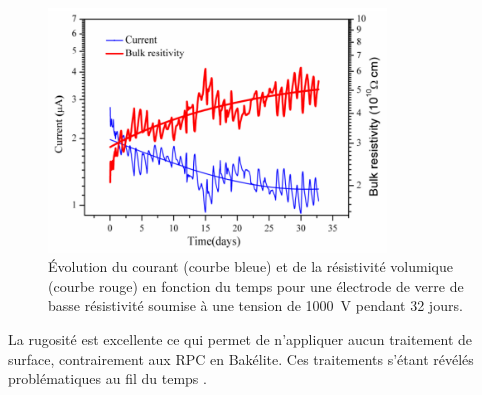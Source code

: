\begin{figure}[ht!]
	\centering
	\includegraphics[width=0.80\textwidth]{GLA/resi.png}
	\captionsetup{type=figure}\caption{Évolution du courant (courbe bleue) et de la résistivité volumique (courbe rouge) en fonction du temps pour une électrode de verre de basse résistivité soumise à une tension de \SI{1000}{\volt} pendant \num{32} jours.}
	\label{resi}
\end{figure}

La rugosité est excellente ce qui permet de n'appliquer aucun traitement de surface, contrairement aux RPC en Bakélite. Ces traitements s'étant révélés problématiques au fil du temps \cite{1352718}.

